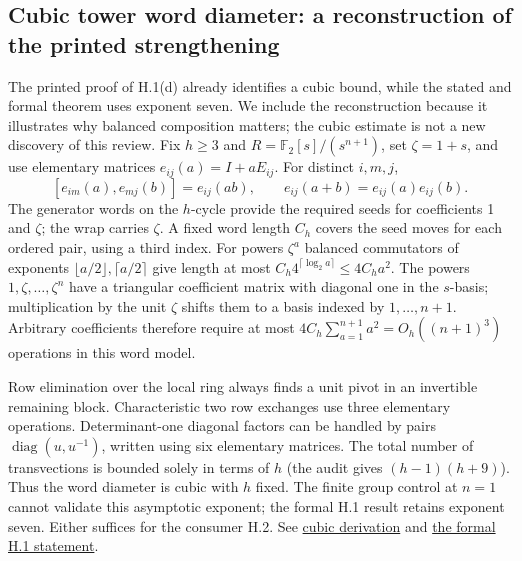 \documentclass[11pt,letterpaper]{article}
\theoremstyle{definition}\newtheorem{definition}[theorem]{Definition}\newtheorem{example}[theorem]{Example}
\theoremstyle{remark}\newtheorem{remark}[theorem]{Remark}
\newcommand{\F}{\mathbb{F}}
\newcommand{\pub}[3]{\href{https://github.com/anthropics/formal-math/blob/11b6c7e3c927df2658f513b6b68ea7f8929c62c5/vp-vnp/#1\#L#2}{#3}}
\newcommand{\aud}[2]{\href{https://github.com/nousentllc/VP-VNP-Review/blob/567303d0bcf4f9d54390437b137752446e58ccd6/#1}{#2}}
\begin{document}
\subsection{Cubic tower word diameter: a reconstruction of the printed strengthening}\label{sec:cubic}
The printed proof of H.1(d) already identifies a cubic bound, while the stated and formal theorem uses exponent seven. We include the reconstruction because it illustrates why balanced composition matters; the cubic estimate is not a new discovery of this review. Fix $h\ge3$ and $R=\F_2[s]/(s^{n+1})$, set $\zeta=1+s$, and use elementary matrices $e_{ij}(a)=I+aE_{ij}$. For distinct $i,m,j$,
\[
 [e_{im}(a),e_{mj}(b)]=e_{ij}(ab),\qquad
 e_{ij}(a+b)=e_{ij}(a)e_{ij}(b).
\]
The generator words on the $h$-cycle provide the required seeds for coefficients 1 and $\zeta$; the wrap carries $\zeta$. A fixed word length $C_h$ covers the seed moves for each ordered pair, using a third index. For powers $\zeta^a$ balanced commutators of exponents $\lfloor a/2\rfloor,\lceil a/2\rceil$ give length at most $C_h4^{\lceil\log_2a\rceil}\le4C_ha^2$. The powers $1,\zeta,\ldots,\zeta^n$ have a triangular coefficient matrix with diagonal one in the $s$-basis; multiplication by the unit $\zeta$ shifts them to a basis indexed by $1,\ldots,n+1$. Arbitrary coefficients therefore require at most $4C_h\sum_{a=1}^{n+1}a^2=O_h((n+1)^3)$ operations in this word model.

Row elimination over the local ring always finds a unit pivot in an invertible remaining block. Characteristic two row exchanges use three elementary operations. Determinant-one diagonal factors can be handled by pairs $\operatorname{diag}(u,u^{-1})$, written using six elementary matrices. The total number of transvections is bounded solely in terms of $h$ (the audit gives $(h-1)(h+9)$). Thus the word diameter is cubic with $h$ fixed. The finite group control at $n=1$ cannot validate this asymptotic exponent; the formal H.1 result retains exponent seven. Either suffices for the consumer H.2. See \aud{passes/14b-tower.md}{cubic derivation} and \pub{Paper/Tower.lean}{25}{the formal H.1 statement}.
\end{document}

